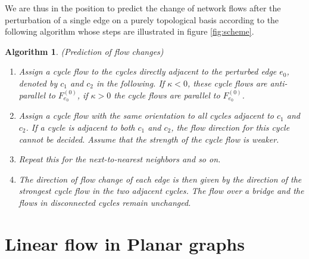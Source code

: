 \documentclass[10pt,aps,pra,twocolumn,superscriptaddress]{revtex4-1}
\newtheorem{alg}{Algorithm}
\begin{document}
We are thus in the position to predict the change of network flows after the perturbation of a single edge
on a purely topological basis according to the following algorithm whose steps are illustrated in figure \ref{fig:scheme}.

\begin{alg}
\label{thm:alg1}
(Prediction of flow changes)
\begin{enumerate}
\item
Assign a cycle flow to the cycles directly adjacent to the perturbed edge $e_0$, denoted by $c_1$ and $c_2$ in the following. If $\kappa < 0$, these cycle flows are anti-parallel to $F^{(0)}_{e_0}$, if $\kappa > 0$ the cycle flows are parallel to $F^{(0)}_{e_0}$.
\item
Assign a cycle flow with the same orientation to all cycles adjacent to $c_1$ and $c_2$. If a cycle is adjacent to both $c_1$ and $c_2$, the flow direction for this cycle cannot be decided. Assume that the strength of the cycle flow is weaker. 
\item
Repeat this for the next-to-nearest neighbors and so on.
\item
The direction of flow change of each edge is then given by the direction of the strongest cycle flow in the two adjacent cycles. The flow over a bridge and the flows in disconnected cycles remain unchanged.
\end{enumerate}
\end{alg}


\section{Linear flow in Planar graphs}
\label{sec:linflow-planar}
\end{document}
